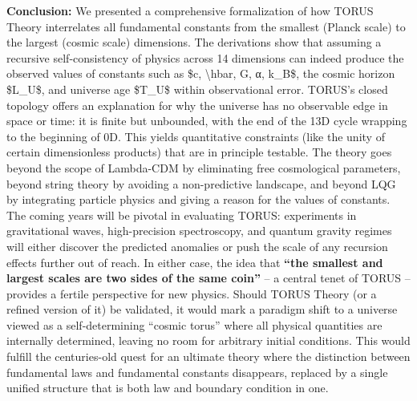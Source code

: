 \documentclass[]{article}
\begin{document}
\textbf{Conclusion:} We presented a comprehensive formalization of how
TORUS Theory interrelates all fundamental constants from the smallest
(Planck scale) to the largest (cosmic scale) dimensions. The derivations
show that assuming a recursive self-consistency of physics across 14
dimensions can indeed produce the observed values of constants such as
\$c, \textbackslash{}hbar, G, α, k\_B\$, the cosmic horizon \$L\_U\$,
and universe age \$T\_U\$ within observational error​. TORUS's closed
topology offers an explanation for why the universe has no observable
edge in space or time: it is finite but unbounded, with the end of the
13D cycle wrapping to the beginning of 0D​. This yields quantitative
constraints (like the unity of certain dimensionless products) that are
in principle testable​. The theory goes beyond the scope of Lambda-CDM
by eliminating free cosmological parameters, beyond string theory by
avoiding a non-predictive landscape, and beyond LQG by integrating
particle physics and giving a reason for the values of constants. The
coming years will be pivotal in evaluating TORUS: experiments in
gravitational waves, high-precision spectroscopy, and quantum gravity
regimes will either discover the predicted anomalies or push the scale
of any recursion effects further out of reach. In either case, the idea
that \textbf{``the smallest and largest scales are two sides of the same
coin''}​ -- a central tenet of TORUS -- provides a fertile perspective
for new physics. Should TORUS Theory (or a refined version of it) be
validated, it would mark a paradigm shift to a universe viewed as a
self-determining ``cosmic torus'' where all physical quantities are
internally determined, leaving no room for arbitrary initial
conditions​. This would fulfill the centuries-old quest for an ultimate
theory where the distinction between fundamental laws and fundamental
constants disappears, replaced by a single unified structure that is
both law and boundary condition in one.
\end{document}

